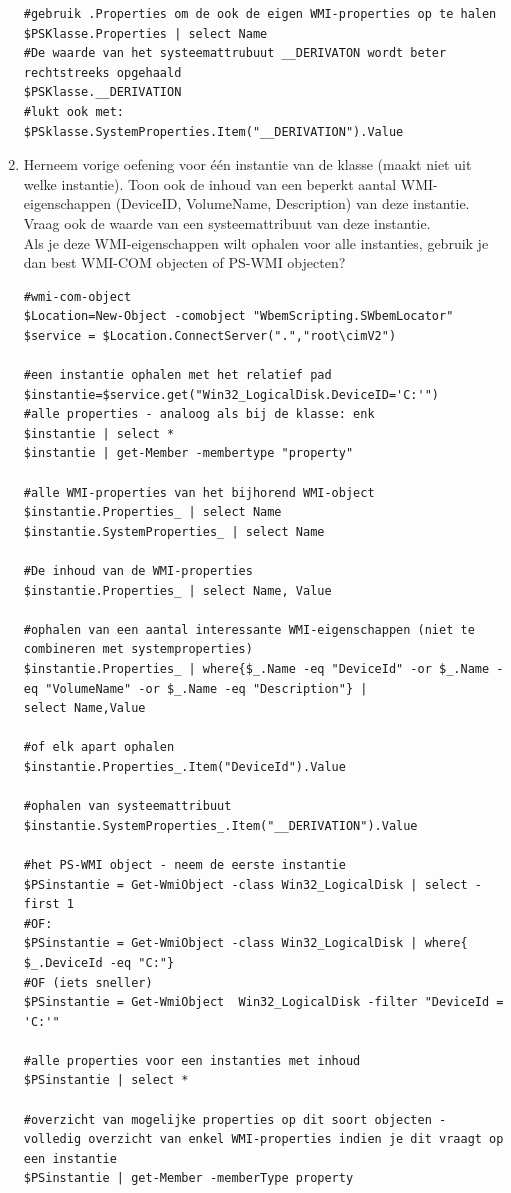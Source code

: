 \documentclass[11pt,a4paper]{report}
\begin{document}
\begin{enumerate}[resume]
\begin{lstlisting}
#gebruik .Properties om de ook de eigen WMI-properties op te halen
$PSKlasse.Properties | select Name
#De waarde van het systeemattrubuut __DERIVATON wordt beter rechtstreeks opgehaald
$PSKlasse.__DERIVATION
#lukt ook met:
$PSklasse.SystemProperties.Item("__DERIVATION").Value
	\end{lstlisting}
	\newpage
	\item Herneem vorige oefening voor één instantie van de klasse (maakt niet uit welke instantie).
	Toon ook de inhoud van een beperkt aantal WMI-eigenschappen (DeviceID, VolumeName, Description) van deze instantie. Vraag ook de waarde van een systeemattribuut van deze instantie.
	\\Als je deze WMI-eigenschappen wilt ophalen voor alle instanties, gebruik je dan best WMI-COM objecten of PS-WMI objecten?
	\begin{lstlisting}
#wmi-com-object
$Location=New-Object -comobject "WbemScripting.SWbemLocator"
$service = $Location.ConnectServer(".","root\cimV2")

#een instantie ophalen met het relatief pad
$instantie=$service.get("Win32_LogicalDisk.DeviceID='C:'")
#alle properties - analoog als bij de klasse: enk
$instantie | select *
$instantie | get-Member -membertype "property"

#alle WMI-properties van het bijhorend WMI-object
$instantie.Properties_ | select Name
$instantie.SystemProperties_ | select Name

#De inhoud van de WMI-properties
$instantie.Properties_ | select Name, Value

#ophalen van een aantal interessante WMI-eigenschappen (niet te combineren met systemproperties)
$instantie.Properties_ | where{$_.Name -eq "DeviceId" -or $_.Name -eq "VolumeName" -or $_.Name -eq "Description"} |
select Name,Value

#of elk apart ophalen
$instantie.Properties_.Item("DeviceId").Value

#ophalen van systeemattribuut
$instantie.SystemProperties_.Item("__DERIVATION").Value

#het PS-WMI object - neem de eerste instantie
$PSinstantie = Get-WmiObject -class Win32_LogicalDisk | select -first 1
#OF:
$PSinstantie = Get-WmiObject -class Win32_LogicalDisk | where{ $_.DeviceId -eq "C:"}
#OF (iets sneller)
$PSinstantie = Get-WmiObject  Win32_LogicalDisk -filter "DeviceId = 'C:'"

#alle properties voor een instanties met inhoud 
$PSinstantie | select *  

#overzicht van mogelijke properties op dit soort objecten - volledig overzicht van enkel WMI-properties indien je dit vraagt op een instantie
$PSinstantie | get-Member -memberType property


\end{lstlisting}
\end{enumerate}
\end{document}
